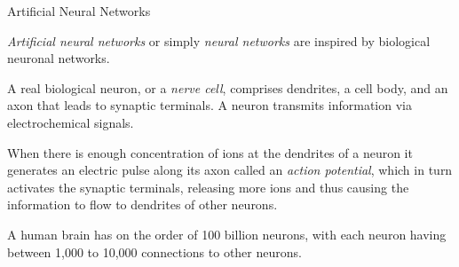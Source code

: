 
\date{Chapter 25: Neural Networks}

\begin{frame}
\titlepage
\end{frame}

%
\begin{frame}{Artificial Neural Networks}

{\em Artificial neural networks} or simply {\em neural networks} are
inspired by biological neuronal networks. 

\medskip

A real biological neuron, or a
{\em nerve cell}, comprises dendrites, a cell body, and an axon that leads
to synaptic terminals. A neuron transmits information via electrochemical
signals. 

\medskip
When there is enough concentration of ions at the dendrites of a
neuron it generates an electric pulse along its axon called an {\em action
potential}, which in turn activates the synaptic terminals, releasing more
ions and thus causing the information to flow to dendrites of other
neurons. 

\medskip

A human brain has on the order of 100 billion neurons, with each
neuron having between 1,000 to 10,000 connections to other neurons. %
%

\end{frame}


